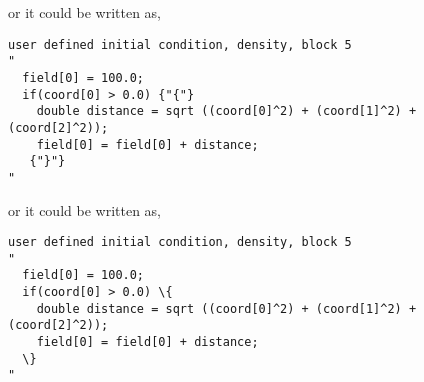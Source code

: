 \noindent
or it could be written as,
%
{\ttfamily \begin{verbatim}
user defined initial condition, density, block 5
" 
  field[0] = 100.0;
  if(coord[0] > 0.0) {"{"}
    double distance = sqrt ((coord[0]^2) + (coord[1]^2) + (coord[2]^2));
    field[0] = field[0] + distance;
   {"}"}
"
\end{verbatim}
}

\noindent
or it could be written as,
%
{\ttfamily \begin{verbatim}
user defined initial condition, density, block 5
" 
  field[0] = 100.0;
  if(coord[0] > 0.0) \{
    double distance = sqrt ((coord[0]^2) + (coord[1]^2) + (coord[2]^2));
    field[0] = field[0] + distance;
  \}
"
\end{verbatim}
}
